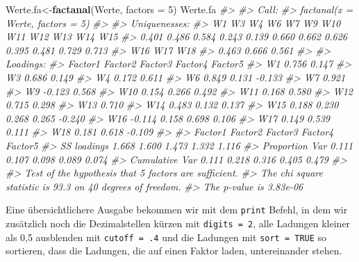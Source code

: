 \documentclass[12pt,ngerman,]{book}
\makeatletter
\newenvironment{Shaded}{\begin{snugshade}}{\end{snugshade}}
\newcommand{\KeywordTok}[1]{\textcolor[rgb]{0.13,0.29,0.53}{\textbf{{#1}}}}
\newcommand{\DataTypeTok}[1]{\textcolor[rgb]{0.13,0.29,0.53}{{#1}}}
\newcommand{\DecValTok}[1]{\textcolor[rgb]{0.00,0.00,0.81}{{#1}}}
\newcommand{\CommentTok}[1]{\textcolor[rgb]{0.56,0.35,0.01}{\textit{{#1}}}}
\newcommand{\NormalTok}[1]{{#1}}
\newenvironment{kframe}{%
\medskip{}
\setlength{\fboxsep}{.8em}
 \def\at@end@of@kframe{}%
 \ifinner\ifhmode%
  \def\at@end@of@kframe{\end{minipage}}%
  \begin{minipage}{\columnwidth}%
 \fi\fi%
 \def\FrameCommand##1{\hskip\@totalleftmargin \hskip-\fboxsep
 \colorbox{shadecolor}{##1}\hskip-\fboxsep
     \hskip-\linewidth \hskip-\@totalleftmargin \hskip\columnwidth}%
 \MakeFramed {\advance\hsize-\width
   \@totalleftmargin\z@ \linewidth\hsize
   \@setminipage}}%
 {\par\unskip\endMakeFramed%
 \at@end@of@kframe}
\renewenvironment{Shaded}{\begin{kframe}}{\end{kframe}}
\makeatother
\begin{document}
\begin{Shaded}
\begin{Highlighting}[]
\NormalTok{Werte.fa<-}\KeywordTok{factanal}\NormalTok{(Werte, }\DataTypeTok{factors =} \DecValTok{5}\NormalTok{)}
\NormalTok{Werte.fa}
\CommentTok{#> }
\CommentTok{#> Call:}
\CommentTok{#> factanal(x = Werte, factors = 5)}
\CommentTok{#> }
\CommentTok{#> Uniquenesses:}
\CommentTok{#>    W1    W3    W4    W6    W7    W9   W10   W11   W12   W13   W14   W15 }
\CommentTok{#> 0.401 0.486 0.584 0.243 0.139 0.660 0.662 0.626 0.395 0.481 0.729 0.713 }
\CommentTok{#>   W16   W17   W18 }
\CommentTok{#> 0.463 0.666 0.561 }
\CommentTok{#> }
\CommentTok{#> Loadings:}
\CommentTok{#>     Factor1 Factor2 Factor3 Factor4 Factor5}
\CommentTok{#> W1           0.756           0.147         }
\CommentTok{#> W3           0.686           0.149         }
\CommentTok{#> W4   0.172   0.611                         }
\CommentTok{#> W6   0.849   0.131          -0.133         }
\CommentTok{#> W7   0.921                                 }
\CommentTok{#> W9          -0.123                   0.568 }
\CommentTok{#> W10          0.154   0.266           0.492 }
\CommentTok{#> W11                  0.168           0.580 }
\CommentTok{#> W12                  0.715           0.298 }
\CommentTok{#> W13                  0.710                 }
\CommentTok{#> W14                  0.483   0.132   0.137 }
\CommentTok{#> W15  0.188   0.230   0.268   0.265  -0.240 }
\CommentTok{#> W16 -0.114   0.158           0.698   0.106 }
\CommentTok{#> W17                  0.149   0.539   0.111 }
\CommentTok{#> W18          0.181           0.618  -0.109 }
\CommentTok{#> }
\CommentTok{#>                Factor1 Factor2 Factor3 Factor4 Factor5}
\CommentTok{#> SS loadings      1.668   1.600   1.473   1.332   1.116}
\CommentTok{#> Proportion Var   0.111   0.107   0.098   0.089   0.074}
\CommentTok{#> Cumulative Var   0.111   0.218   0.316   0.405   0.479}
\CommentTok{#> }
\CommentTok{#> Test of the hypothesis that 5 factors are sufficient.}
\CommentTok{#> The chi square statistic is 93.3 on 40 degrees of freedom.}
\CommentTok{#> The p-value is 3.83e-06}
\end{Highlighting}
\end{Shaded}

Eine übersichtlichere Ausgabe bekommen wir mit dem \texttt{print}
Befehl, in dem wir zusätzlich noch die Dezimalstellen kürzen mit
\texttt{digits\ =\ 2}, alle Ladungen kleiner als 0,5 ausblenden mit
\texttt{cutoff\ =\ .4} und die Ladungen mit \texttt{sort\ =\ TRUE} so
sortieren, dass die Ladungen, die auf einen Faktor laden, untereinander
stehen.
\end{document}
